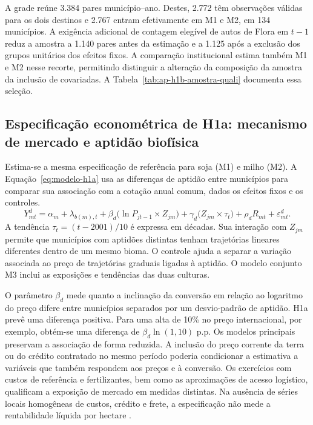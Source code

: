 A grade reúne 3.384 pares município--ano. Destes, 2.772 têm observações válidas para os dois destinos e 2.767 entram efetivamente em M1 e M2, em 134 municípios. A exigência adicional de contagem elegível de autos de Flora em $t-1$ reduz a amostra a 1.140 pares antes da estimação e a 1.125 após a exclusão dos grupos unitários dos efeitos fixos. A comparação institucional estima também M1 e M2 nesse recorte, permitindo distinguir a alteração da composição da amostra da inclusão de covariadas. A Tabela~\ref{tab:ap-h1b-amostra-quali} documenta essa seleção.

\subsection{Especificação econométrica de H1a: mecanismo de mercado e aptidão biofísica}
\label{estrategia-h1a}

Estima-se a mesma especificação de referência para soja (M1) e milho (M2). A Equação~\eqref{eq:modelo-h1a} usa as diferenças de aptidão entre municípios para comparar sua associação com a cotação anual comum, dados os efeitos fixos e os controles.
\begin{equation}
    Y_{mt}^d = \alpha_m + \lambda_{b(m),t} + \beta_d \big(\ln P_{jt-1} \times Z_{jm}\big) + \gamma_d \big(Z_{jm} \times \tau_t\big) + \rho_d R_{mt} + \varepsilon_{mt}^d .
    \label{eq:modelo-h1a}
\end{equation}
A tendência $\tau_t=(t-2001)/10$ é expressa em décadas. Sua interação com $Z_{jm}$ permite que municípios com aptidões distintas tenham trajetórias lineares diferentes dentro de um mesmo bioma. O controle ajuda a separar a variação associada ao preço de trajetórias graduais ligadas à aptidão. O modelo conjunto M3 inclui as exposições e tendências das duas culturas.

O parâmetro $\beta_d$ mede quanto a inclinação da conversão em relação ao logaritmo do preço difere entre municípios separados por um desvio-padrão de aptidão. H1a prevê uma diferença positiva. Para uma alta de 10\% no preço internacional, por exemplo, obtém-se uma diferença de $\beta_d \ln(1{,}10)$ p.p. Os modelos principais preservam a associação de forma reduzida. A inclusão do preço corrente da terra ou do crédito contratado no mesmo período poderia condicionar a estimativa a variáveis que também respondem aos preços e à conversão. Os exercícios com custos de referência e fertilizantes, bem como as aproximações de acesso logístico, qualificam a exposição de mercado em medidas distintas. Na ausência de séries locais homogêneas de custos, crédito e frete, a especificação não mede a rentabilidade líquida por hectare \cite{Angelsen2010, LubowskiEtAl2008}.

